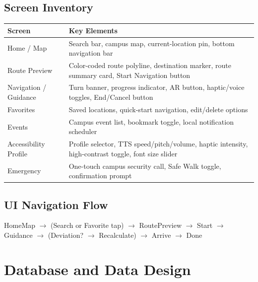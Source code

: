 \documentclass[12pt]{article}
\begin{document}
\subsection{Screen Inventory}
\begin{tabularx}{\textwidth}{|l|X|}
\hline
\textbf{Screen} & \textbf{Key Elements} \\
\hline
Home / Map & Search bar, campus map, current-location pin, bottom navigation bar \\
\hline
Route Preview & Color-coded route polyline, destination marker, route summary card, Start Navigation button \\
\hline
Navigation / Guidance & Turn banner, progress indicator, AR button, haptic/voice toggles, End/Cancel button \\
\hline
Favorites & Saved locations, quick-start navigation, edit/delete options \\
\hline
Events & Campus event list, bookmark toggle, local notification scheduler \\
\hline
Accessibility Profile & Profile selector, TTS speed/pitch/volume, haptic intensity, high-contrast toggle, font size slider \\
\hline
Emergency & One-touch campus security call, Safe Walk toggle, confirmation prompt \\
\hline
\end{tabularx}

\subsection{UI Navigation Flow}
HomeMap $\rightarrow$ (Search or Favorite tap) $\rightarrow$ RoutePreview $\rightarrow$ Start $\rightarrow$ Guidance $\rightarrow$ (Deviation? $\rightarrow$ Recalculate) $\rightarrow$ Arrive $\rightarrow$ Done

\section{Database and Data Design}
\end{document}

